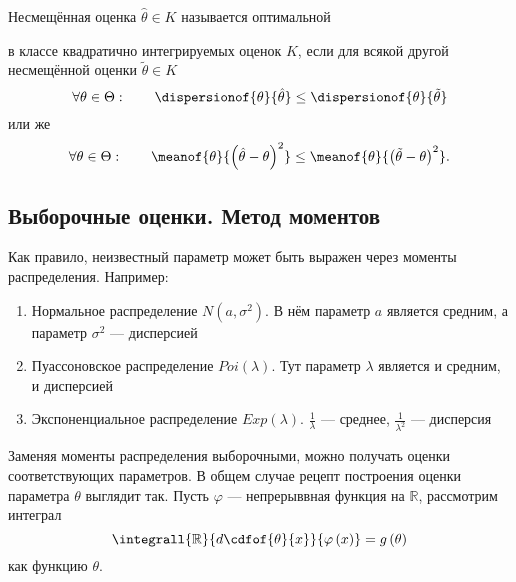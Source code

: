 \begin{definition}
  Несмещённая оценка $\hat{\theta}\in K$ называется оптимальной
  \begin{comment}
  \footnote{В учебнике Боровкова А. А.
  ``Математическая статистика'' оценка, удовлетворяющая этим условиям,
  носит название \textbf{эффективная оценка} \cite[стр.~130]{BorovkovMS},
  но у нас этот термин будет использоваться далее в другом смысле}
  \end{comment}
  в классе квадратично интегрируемых оценок $K$,
  если для всякой другой несмещённой оценки $\tilde{\theta}\in K$
  \begin{equation*}
    \forall\theta\in\Theta:\qquad
    \dispersionof{\theta}{\hat{\theta}} \le \dispersionof{\theta}{\tilde{\theta}}
  \end{equation*}
  или же
  \begin{equation*}
    \forall\theta\in\Theta:\qquad
    \meanof{\theta}{\left(\hat{\theta} - \theta\right)^2}
    \le \meanof{\theta}{\left( \tilde{\theta} - \theta \right)^2}.
  \end{equation*}
\end{definition}

\subsection{Выборочные оценки. Метод моментов}
Как правило, неизвестный параметр может быть выражен через моменты
распределения. Например:

\begin{enumerate}
  \item Нормальное распределение $N\left(a,\sigma^2\right)$.
    В нём параметр $a$ является средним,
    а параметр $\sigma^2$ --- дисперсией
  \item Пуассоновское распределение $Poi\left(\lambda\right)$.
    Тут параметр $\lambda$ является и средним, и дисперсией
  \item Экспоненциальное распределение $Exp\left(\lambda\right)$.
    $\frac{1}{\lambda}$ --- среднее,
    $\frac{1}{\lambda^2}$ --- дисперсия
\end{enumerate}

Заменяя моменты распределения выборочными, можно получать оценки
соответствующих параметров.
В общем случае рецепт построения оценки параметра $\theta$ выглядит так.
Пусть $\varphi$ --- непрерыввная функция на $\mathbb{R}$, рассмотрим интеграл
\begin{equation*}
  \integrall{\mathbb{R}}{d\cdfof{\theta}{x}}{\varphi\left( x \right)}
  = g\left( \theta \right)
\end{equation*}
как функцию $\theta$.

